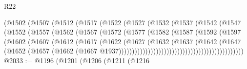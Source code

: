 \begin{lexlean}{R22}
\begin{coremodule}
                              (@1502
                                (@1507
                                  (@1512
                                    (@1517
                                      (@1522
                                        (@1527
                                          (@1532
                                            (@1537
                                              (@1542
                                                (@1547
                                                  (@1552
                                                    (@1557
                                                      (@1562
                                                        (@1567
                                                          (@1572
                                                            (@1577
                                                              (@1582
                                                                (@1587
                                                                  (@1592
                                                                    (@1597
                                                                      (@1602
                                                                        (@1607
                                                                          (@1612
                                                                            (@1617
                                                                              (@1622
                                                                                (@1627
                                                                                  (@1632
                                                                                    (@1637
                                                                                      (@1642
                                                                                        (@1647
                                                                                          (@1652
                                                                                            (@1657
                                                                                              (@1662
                                                                                                (@1667
                                                                                                  @1937)))))))))))))))))))))))))))))))))))))))))))))))
@2033 := @1196
    (@1201
      (@1206
        (@1211
          (@1216

\end{coremodule}
\end{lexlean}
